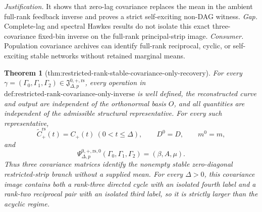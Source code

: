 \documentclass{article}
\newtheorem{theorem}{Theorem}
\begin{document}
\par\smallskip\noindent \textit{Justification.} It shows that zero-lag covariance replaces the mean in the ambient full-rank feedback inverse and proves a strict self-exciting non-DAG witness. \textit{Gap.} Complete-lag and spectral Hawkes results do not isolate this exact three-covariance fixed-bin inverse on the full-rank principal-strip image. \textit{Consumer.} Population covariance archives can identify full-rank reciprocal, cyclic, or self-exciting stable networks without retained marginal means.

\begin{theorem}[thm:restricted-rank-stable-covariance-only-recovery]\label{thm:restricted-rank-stable-covariance-only-recovery}
For every \(\gamma=(\Gamma_0,\Gamma_1,\Gamma_2)\in
\mathfrak J_{\Delta,p}^{0,+,\mathrm{rs}}\), every operation in \(\text{def:restricted-rank-covariance-only-inverse}\) is well defined, the reconstructed curve and output are independent of the orthonormal basis \(O\), and all quantities are independent of the admissible structural representative.  For every such representative,
\[
 \widetilde C_{+}^{\mathrm{rs}}(t)=C_{+}(t)\ (0<t\leq\Delta),
 \qquad D^0=D,\qquad m^0=m,
\]
and
\[
 \Psi_{\Delta,p}^{0,+,\mathrm{rs},0}
 (\Gamma_0,\Gamma_1,\Gamma_2)=(\beta,A,\mu).
\]
Thus three covariance matrices identify the nonempty stable zero-diagonal restricted-strip branch without a supplied mean.  For every \(\Delta>0\), this covariance image contains both a rank-three directed cycle with an isolated fourth label and a rank-two reciprocal pair with an isolated third label, so it is strictly larger than the acyclic regime.
\end{theorem}
\end{document}
